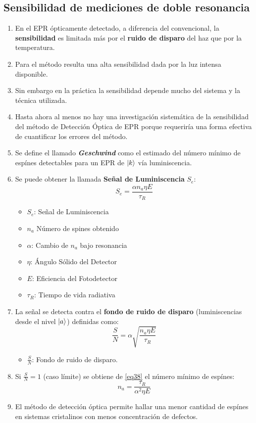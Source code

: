 \documentclass[aps,rmp,reprint,longbibliography]{revtex4-1}
\begin{document}
\subsection{Sensibilidad de mediciones de doble resonancia}
\begin{enumerate}
\item En el EPR ópticamente detectado, a diferencia del convencional, la \textbf{sensibilidad} es limitada más por el \textbf{ruido de disparo} del haz que por la temperatura. 
\item Para el método resulta una alta sensibilidad dada por la luz intensa disponible. 
\item Sin embargo en la práctica la sensibilidad depende mucho del sistema y la técnica utilizada. 
\item Hasta ahora al menos no hay una investigación sistemática de la sensibilidad del método de Detección Óptica de EPR porque requeriría una forma efectiva de cuantificar los errores del método.
\item Se define el llamado \textbf{\textit{Geschwind}} como el estimado del número mínimo de espínes detectables para un EPR de $\ket{k}$ vía luminiscencia. 
\item Se puede obtener la llamada \textbf{Señal de Luminiscencia} $S_e$:
\begin{equation}\label{eq37}S_e=\frac{\alpha n_a\eta E}{\tau_R}\end{equation}
\begin{itemize}
    \item $S_e$: Señal de Luminiscencia
    \item $n_a$ Número de spines obtenido
    \item $\alpha$: Cambio de $n_a$ bajo resonancia
    \item $\eta$: Ángulo Sólido del Detector
    \item $E$: Eficiencia del Fotodetector
    \item $\tau_R$: Tiempo de vida radiativa
\end{itemize}
\item La señal se detecta contra el \textbf{fondo de ruido de disparo} (luminiscencias desde el nivel $\ket{a}$)  definidas como:
\begin{equation}\label{eq38}\frac{S}{N}=\alpha\sqrt{\frac{n_a\eta E}{\tau_R}}\end{equation}
\begin{itemize}
    \item $\frac{S}{N}$: Fondo de ruido de disparo.
\end{itemize}
\item Si $\frac{S}{N}=1$ (caso límite) se obtiene de \ref{eq38} el número mínimo de espínes:
\begin{equation}\label{eq39}n_a=\frac{\tau_R}{\alpha^2\eta E }\end{equation}
\item El método de detección óptica permite hallar una menor cantidad de espínes en sistemas cristalinos con menos concentración de defectos.
\end{enumerate}
\end{document}
